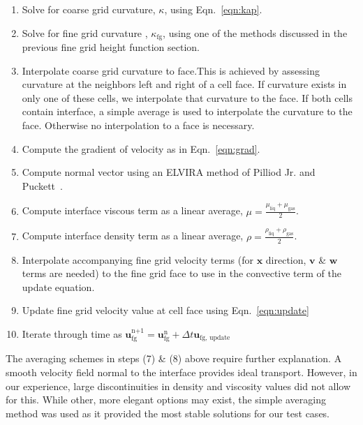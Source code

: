 \begin{enumerate}
	\item Solve for coarse grid curvature, $\kappa$, using Eqn.~\ref{eqn:kap}.
	\item Solve for fine grid curvature , $\kappa_{\text{fg}}$, using one of the methods discussed in the previous fine grid height function section.
	\item Interpolate coarse grid curvature to face.This is achieved by assessing curvature at the neighbors left and right of a cell face. If curvature exists in only one of these cells, we interpolate that curvature to the face. If both cells contain interface, a simple average is used to interpolate the curvature to the face. Otherwise no interpolation to a face is necessary.
	\item Compute the gradient of velocity as in Eqn.~\ref{eqn:grad}.
	\item Compute normal vector using an ELVIRA method of Pilliod Jr. and Puckett~\cite{pilliod}.
	\item Compute interface viscous term as a linear average, $\mu =\frac{ \mu_{\text{liq}} + \mu_{\text{gas}}}{2}$.
	\item Compute interface density term as a linear average, $\rho =\frac{ \rho_{\text{liq}} + \rho_{\text{gas}}}{2}$.
	\item Interpolate accompanying fine grid velocity terms (for $\bm{x}$ direction, $\bm{v}$ \& $\bm{w}$ terms are needed) to the fine grid face to use in the convective term of the update equation.
	\item Update fine grid velocity value at cell face using Eqn.~\ref{eqn:update}
	\item Iterate through time as $\bm{u}_{\text{fg}}^{\text{n+1}}  = \bm{u}_{\text{fg}}^{\text{n}}+ \Delta t \bm{u}_{\text{fg, update}}$
\end{enumerate}
The averaging schemes in steps (7) \& (8) above require further explanation. A smooth velocity field normal to the interface provides ideal transport. However, in our experience, large discontinuities in density and viscosity values did not allow for this. While other, more elegant options may exist, the simple averaging method was used as it provided the most stable solutions for our test cases.  

